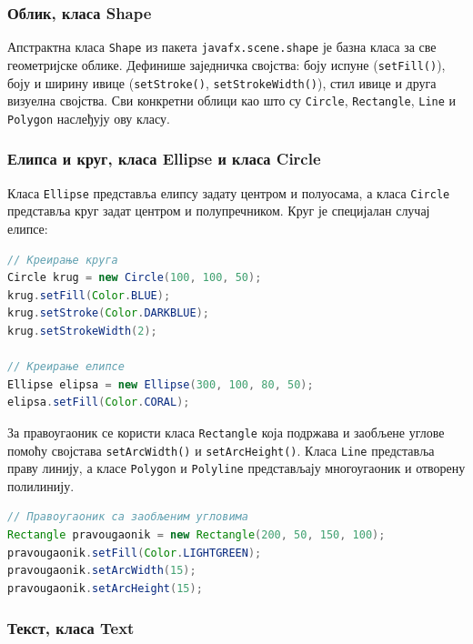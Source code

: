 \subsubsection{Облик, класа Shape}

Апстрактна класа \texttt{Shape} из пакета \texttt{javafx.scene.shape} је базна класа за све геометријске облике. Дефинише заједничка својства: боју испуне (\texttt{setFill()}), боју и ширину ивице (\texttt{setStroke()}, \texttt{setStrokeWidth()}), стил ивице и друга визуелна својства. Сви конкретни облици као што су \texttt{Circle}, \texttt{Rectangle}, \texttt{Line} и \texttt{Polygon} наслеђују ову класу.

\subsubsection{Елипса и круг, класа Ellipse и класа Circle}

Класа \texttt{Ellipse} представља елипсу задату центром и полуосама, а класа \texttt{Circle} представља круг задат центром и полупречником. Круг је специјалан случај елипсе:


\begin{lstlisting}[language=Java]
// Креирање круга
Circle krug = new Circle(100, 100, 50);
krug.setFill(Color.BLUE);
krug.setStroke(Color.DARKBLUE);
krug.setStrokeWidth(2);
 
// Креирање елипсе
Ellipse elipsa = new Ellipse(300, 100, 80, 50);
elipsa.setFill(Color.CORAL);
\end{lstlisting}


За правоугаоник се користи класа \texttt{Rectangle} која подржава и заобљене углове помоћу својстава \texttt{setArcWidth()} и \texttt{setArcHeight()}. Класа \texttt{Line} представља праву линију, а класе \texttt{Polygon} и \texttt{Polyline} представљају многоугаоник и отворену полилинију.


\begin{lstlisting}[language=Java]
// Правоугаоник са заобљеним угловима
Rectangle pravougaonik = new Rectangle(200, 50, 150, 100);
pravougaonik.setFill(Color.LIGHTGREEN);
pravougaonik.setArcWidth(15);
pravougaonik.setArcHeight(15);
\end{lstlisting}


\subsubsection{Текст, класа Text}

